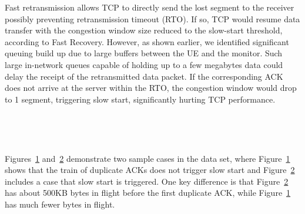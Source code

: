 Fast retransmission allows TCP to directly send the lost segment to the receiver possibly preventing retransmission timeout (RTO). If so, TCP would resume data transfer with
 the congestion window size reduced to the slow-start threshold, according to Fast Recovery. However, as shown earlier, we identified significant queuing build up due to large buffers between the UE and the monitor.
Such large in-network queues capable of holding up to a few megabytes data could delay the receipt of the retransmitted data packet. If the corresponding ACK does not arrive at the server within the RTO, the congestion window would drop to 1 segment, triggering slow start, significantly hurting TCP performance.

\begin{figure}[t]
\centering
{}\\
\label{fig:seq.ack1}
\vspace{-.1in}
\end{figure}

\begin{figure}[t]
\centering
{}\\
\label{fig:seq.ack2}
\vspace{-.1in}
\end{figure}

Figures~\ref{fig:seq.ack1} and~\ref{fig:seq.ack2} demonstrate two sample cases in the data set, where Figure~\ref{fig:seq.ack1} shows that the train of duplicate ACKs does not trigger slow start and Figure~\ref{fig:seq.ack2} includes a case that slow start is triggered. One key difference is that Figure~\ref{fig:seq.ack2} has about 500KB bytes in flight before the first duplicate ACK, while Figure~\ref{fig:seq.ack1} has much fewer bytes in flight.

